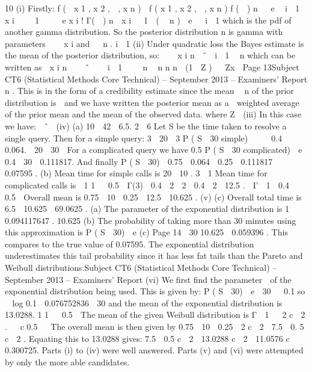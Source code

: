 \documentclass[a4paper,12pt]{article}
\begin{document}
10
(i)
Firstly:
f (  x 1 , x 2 ,  , x n )  f ( x 1 , x 2 ,  , x n ) f (  )
n
  e

i  1
 x i    1 

 e
x i ! Γ(  )
n
 x i  1  (  n ) 
e
  i  1
which is the pdf of another gamma distribution. So the posterior distribution
n
is gamma with parameters    x i and   n .
i  1
(ii)
Under quadratic loss the Bayes estimate is the mean of the posterior
distribution, so:
   x i
n
 ˆ 
i  1
 n
which can be written as
 x i n


 ˆ  
 i  1 
  n
 n
n
n
 (1  Z )

 Zx

Page 13Subject CT6 (Statistical Methods Core Technical) – September 2013 – Examiners’ Report
n
. This is in the form of a credibility estimate since the mean
 n
of the prior distribution is  and we have written the posterior mean as a

weighted average of the prior mean and the mean of the observed data.
where Z 
(iii)
In this case we have:
 ˆ 
(iv)
(a)
10  42
 6.5.
2  6
Let S be the time taken to resolve a single query. Then for a simple
query:
3
 20 
3
P ( S  30 simple)  
  0.4  0.064.
 20  30 
For a complicated query we have
0.5
P ( S  30 complicated)  e  0.4  30
 0.111817.
And finally
P ( S  30)  0.75  0.064  0.25  0.111817  0.07595 .
(b)
Mean time for simple calls is
20
 10 .
3  1
Mean time for complicated calls is
 1
1 

0.5  Γ(3)  0.4  2  2  0.4  2  12.5 .

Γ  1 
0.4

 0.5 
Overall mean is 0.75  10  0.25  12.5  10.625 .
(v)
(c) Overall total time is 6.5  10.625  69.0625 .
(a) The parameter of the exponential distribution is
1
 0.094117647 .
10.625
(b) The probability of taking more than 30 minutes using this
approximation is P ( S  30)  e
(c)
Page 14

30
10.625
 0.059396 .
This compares to the true value of 0.07595. The exponential
distribution underestimates this tail probability since it has less fat tails
than the Pareto and Weibull distributions.Subject CT6 (Statistical Methods Core Technical) – September 2013 – Examiners’ Report
(vi)
We first find the parameter  of the exponential distribution being used. This
is given by:
P ( S  30)  e  30   0.1
so

log 0.1
 0.076752836
 30
and the mean of the exponential distribution is 13.0288.
1
1   0.5

The mean of the given Weibull distribution is Γ  1 
 2 c  2 .
  c
0.5


The overall mean is then given by 0.75  10  0.25  2 c  2  7.5  0. 5 c  2 .
Equating this to 13.0288 gives:
7.5  0.5 c  2  13.0288
c  2  11.0576
c  0.300725.
Parts (i) to (iv) were well answered. Parts (v) and (vi) were attempted by only the more able
candidates.
\end{document}
